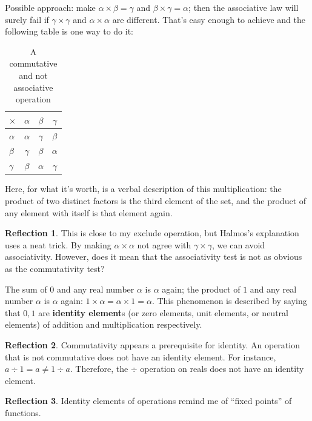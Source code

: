 \documentclass[english,notitlepage,smartquotes]{hgbreport}
\theoremstyle{definition}
\theoremstyle{definition}
\theoremstyle{remark}
\theoremstyle{plain}
\theoremstyle{definition}
\theoremstyle{definition}
\newtheorem{reflection}{Reflection}
\begin{document}
Possible approach: make $\alpha\times\beta=\gamma$ and $\beta\times\gamma=\alpha$; then the associative law will surely fail if $\gamma\times\gamma$ and $\alpha\times\alpha$ are different. That's easy enough to achieve and the following table is one way to do it:

\begin{table}[h!]
\centering
\begin{tabular}{l|ccc}
$\times$&$\alpha$&$\beta$&$\gamma$\\
\hline
$\alpha$&$\alpha$&$\gamma$&$\beta$\\
$\beta$&$\gamma$&$\beta$&$\alpha$\\
$\gamma$&$\beta$&$\alpha$&$\gamma$\\
\end{tabular}
\caption{A commutative and not associative operation}
\label{tab:comnotassoc}
\end{table}
Here, for what it's worth, is a verbal description of this multiplication: the product of two distinct factors is the third element of the set, and the product of any element with itself is that element again.

\begin{reflection}
This is close to my exclude operation, but Halmos's explanation uses a neat trick. By making $\alpha\times\alpha$ not agree with $\gamma\times\gamma$, we can avoid associativity. However, does it mean that the associativity test is not as obvious as the commutativity test?
\end{reflection}

The sum of $0$ and any real number $\alpha$ is $\alpha$ again; the product of $1$ and any real number $\alpha$ is $\alpha$ again: $1\times\alpha=\alpha\times 1=\alpha$. This phenomenon is described by saying that $0,1$ are \textbf{identity element}s (or zero elements, unit elements, or neutral elements) of addition and multiplication respectively. 

\begin{reflection}
Commutativity appears a prerequisite for identity. An operation that is not commutative does not have an identity element. For instance, $a\div 1=a\ne 1\div a$. Therefore, the $\div$ operation on reals does not have an identity element.
\end{reflection}

\begin{reflection}
Identity elements of operations remind me of ``fixed points'' of functions.
\end{reflection}
\end{document}
